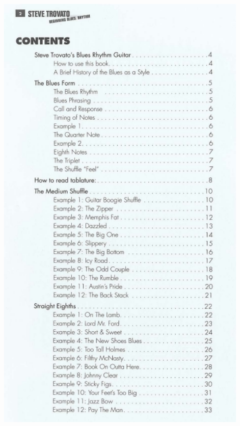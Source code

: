 \documentclass[a4paper]{book}
\begin{document}
\begin{center}
\includegraphics[width=12.52cm,height=22.555cm]{lebluessupportsmethodes-img54.png}
\end{center}






\clearpage
\end{document}
